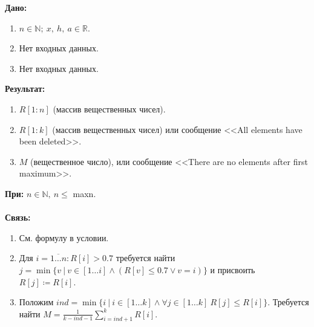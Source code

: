 \textbf{Дано:}
\begin{enumerate}
    \item \(n \in \mathbb{N};\ x,\ h,\ a \in \mathbb{R}\).
    \item Нет входных данных.
    \item Нет входных данных.
\end{enumerate}
\noindent
\textbf{Результат:}
\begin{enumerate}
   \item \(R[1{:}n]\) (массив вещественных чисел).
   \item \(R[1{:}k]\) (массив вещественных чисел) или сообщение <<All elements have been deleted>>.
   \item \(M\) (вещественное число), или сообщение <<There are no elements after first maximum>>.
\end{enumerate} 
\noindent
\textbf{При:} \(n \in \mathbb{N},\ n \leq\) maxn.\\ \\  
\textbf{Связь:} 
\begin{enumerate}
    \item См. формулу в условии.
    \item Для \(i = \overline{1 \dots n}: R[i] > 0.7\) требуется найти \(j = \min\{v\ |\ v \in [1 \dots i] \land (R[v] \leq 0.7 \lor v = i)\}\) и присвоить \(R[j] \coloneqq R[i]\).
    \item Положим \(ind = \min\{i\ |\ i \in [1 \dots k] \land \forall j \in [1 \dots k]\ R[j] \leq R[i]\}\). Требуется найти \(\displaystyle M = \frac{1}{k - ind - 1} \sum\limits_{i = ind+1}^{k}R[i]\).  
\end{enumerate}